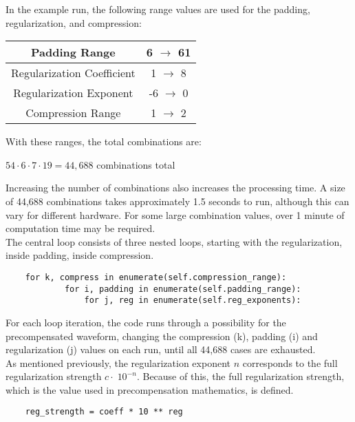 \documentclass[11pt, a4paper]{article}
\theoremstyle{definition}
\numberwithin{equation}{section}
\begin{document}
In the example run, the following range values are used for the padding, regularization, and compression:

\begin{center}
\begin{tabular}{ | c | c | } 
  \hline
   Padding Range & 6 $\rightarrow$ 61 \\ 
  \hline
  Regularization Coefficient & 1 $\rightarrow$ 8 \\ 
  \hline
  Regularization Exponent & -6 $\rightarrow$ 0 \\ 
  \hline
  Compression Range & 1 $\rightarrow$ 2 \\ 
  \hline
\end{tabular}
\end{center}

With these ranges, the total combinations are:

\begin{center}
    $54 \cdot 6 \cdot 7 \cdot 19 = 44,688$ combinations total
\end{center}

Increasing the number of combinations also increases the processing time. A size of 44,688 combinations takes approximately 1.5 seconds to run, although this can vary for different hardware. For some large combination values, over 1 minute of computation time may be required.
\\
The central loop consists of three nested loops, starting with the regularization, inside padding, inside compression.

\begin{verbatim}
    for k, compress in enumerate(self.compression_range):
            for i, padding in enumerate(self.padding_range):
                for j, reg in enumerate(self.reg_exponents):
\end{verbatim}

For each loop iteration, the code runs through a possibility for the precompensated waveform, changing the compression (k), padding (i) and regularization (j) values on each run, until all 44,688 cases are exhausted.
\\
As mentioned previously, the regularization exponent $n$ corresponds to the full regularization strength $c \cdot \; 10^{-n}$. Because of this, the full regularization strength, which is the value used in precompensation mathematics, is defined.

\begin{verbatim}
    reg_strength = coeff * 10 ** reg
\end{verbatim}
\end{document}
